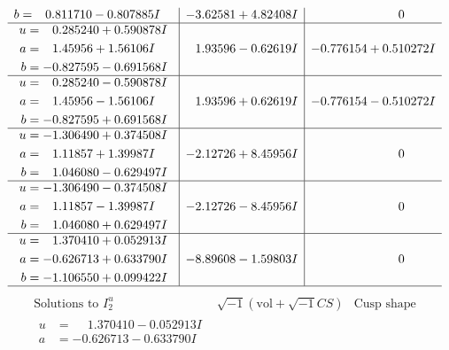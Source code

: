 \documentclass[1p]{elsarticle_modified}
\theoremstyle{definition}
\newcommand{\I}{\sqrt{-1}}
\begin{document}
$$\begin{array}{c|c|c}
\begin{aligned}
b &= \phantom{-}0.811710 - 0.807885 I\end{aligned}
 & -3.62581 + 4.82408 I & \phantom{-0.000000 } 0 \\ \hline\begin{aligned}
u &= \phantom{-}0.285240 + 0.590878 I \\
a &= \phantom{-}1.45956 + 1.56106 I \\
b &= -0.827595 - 0.691568 I\end{aligned}
 & \phantom{-}1.93596 - 0.62619 I & -0.776154 + 0.510272 I \\ \hline\begin{aligned}
u &= \phantom{-}0.285240 - 0.590878 I \\
a &= \phantom{-}1.45956 - 1.56106 I \\
b &= -0.827595 + 0.691568 I\end{aligned}
 & \phantom{-}1.93596 + 0.62619 I & -0.776154 - 0.510272 I \\ \hline\begin{aligned}
u &= -1.306490 + 0.374508 I \\
a &= \phantom{-}1.11857 + 1.39987 I \\
b &= \phantom{-}1.046080 - 0.629497 I\end{aligned}
 & -2.12726 + 8.45956 I & \phantom{-0.000000 } 0 \\ \hline\begin{aligned}
u &= -1.306490 - 0.374508 I \\
a &= \phantom{-}1.11857 - 1.39987 I \\
b &= \phantom{-}1.046080 + 0.629497 I\end{aligned}
 & -2.12726 - 8.45956 I & \phantom{-0.000000 } 0 \\ \hline\begin{aligned}
u &= \phantom{-}1.370410 + 0.052913 I \\
a &= -0.626713 + 0.633790 I \\
b &= -1.106550 + 0.099422 I\end{aligned}
 & -8.89608 - 1.59803 I & \phantom{-0.000000 } 0\\
 \hline 
 \end{array}$$\newpage$$\begin{array}{c|c|c}  
\text{Solutions to }I^u_{2}& \I (\text{vol} + \sqrt{-1}CS) & \text{Cusp shape}\\
 \hline 
\begin{aligned}
u &= \phantom{-}1.370410 - 0.052913 I \\
a &= -0.626713 - 0.633790 I \\

\end{aligned}
\end{array}$$
\end{document}
